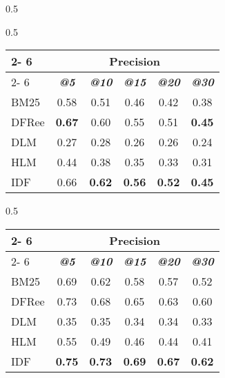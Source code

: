 \begin{table*}[]
\begin{small}
\begin{subtable}[b]{0.5\textwidth}
 	 \end{subtable} \vspace{0.6cm}

 	\begin{subtable}[b]{0.5\textwidth}
 	\caption{2013 collection} 

	\begin{tabular}{l|c|c|c|c|c} 
	
	\cline{2- 6}
	\multicolumn{1}{c}{}&\multicolumn{5}{c}{Precision} \\ 
	\cline{2- 6} &
	\textit{\textbf{@5}} & 
	\textit{\textbf{@10}} & 
	\textit{\textbf{@15}} & 
	\textit{\textbf{@20}} & 
	\textit{\textbf{@30}} 
	
	\tabularnewline
	\hline
BM25 & 0.58 & 0.51 & 0.46 & 0.42 & 0.38 \\
DFRee & \textbf{0.67} & 0.60 & 0.55 & 0.51 & \textbf{0.45} \\
DLM & 0.27 & 0.28 & 0.26 & 0.26 & 0.24 \\
HLM & 0.44 & 0.38 & 0.35 & 0.33 & 0.31 \\
IDF & 0.66 & \textbf{0.62} & \textbf{0.56} & \textbf{0.52} & \textbf{0.45} \\

 	\hline
 	\end{tabular}
 
 	\end{subtable}  
 		 \hspace{2em}
 	  	\begin{subtable}[b]{0.5\textwidth}
 	 
 	  	\centering
 	  	\caption{2014 collection} 
 	 
 	 	\begin{tabular}{l|c|c|c|c|c} 
 	 	
 	 	\cline{2- 6}
 	 	\multicolumn{1}{c}{}&\multicolumn{5}{c}{Precision} \\ 
 	 	\cline{2- 6} &
 	 	\textit{\textbf{@5}} & 
 	 	\textit{\textbf{@10}} & 
 	 	\textit{\textbf{@15}} & 
 	 	\textit{\textbf{@20}} & 
 	 	\textit{\textbf{@30}} 
 	 	
 	 	\tabularnewline
 	 	\hline
	 	 BM25 & 0.69 & 0.62 & 0.58 & 0.57 & 0.52 \\
	 	 DFRee & 0.73 & 0.68 & 0.65 & 0.63 & 0.60 \\
	 	 DLM & 0.35 & 0.35 & 0.34 & 0.34 & 0.33 \\
	 	 HLM & 0.55 & 0.49 & 0.46 & 0.44 & 0.41 \\
	 	 IDF & \textbf{0.75} & \textbf{0.73} & \textbf{0.69} & \textbf{0.67} & \textbf{0.62} \\
 	 

\end{tabular}
\end{subtable}
\end{small}
\end{table*}
